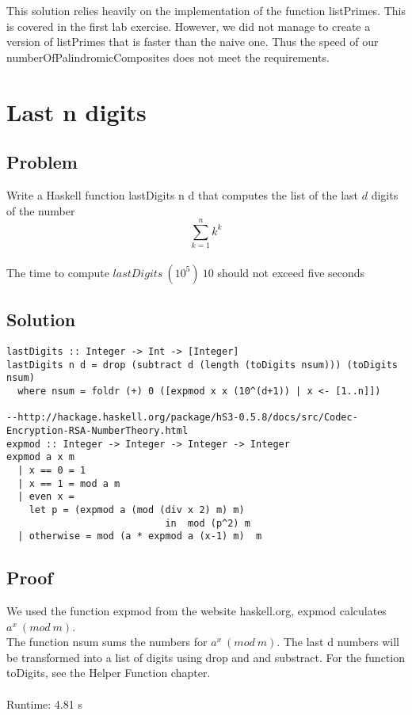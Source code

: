 \documentclass[a4paper,11pt]{article}
\begin{document}
This solution relies heavily on the implementation of the function listPrimes. This is covered in the first lab exercise. However, we did not manage to create a version of listPrimes that is faster than the naive one. Thus the speed of our numberOfPalindromicComposites does not meet the requirements.


\section{Last n digits}
\subsection{Problem}
Write a Haskell function lastDigits n d that computes the list of the last $d$ digits of the number
\begin{equation}
\sum\limits_{k=1}^n k^k
\end{equation}
\\
The time to compute $lastDigits\: (10^5)\: 10$ should not exceed five seconds

\subsection{Solution}

\begin{lstlisting}
lastDigits :: Integer -> Int -> [Integer]
lastDigits n d = drop (subtract d (length (toDigits nsum))) (toDigits nsum)
  where nsum = foldr (+) 0 ([expmod x x (10^(d+1)) | x <- [1..n]])

--http://hackage.haskell.org/package/hS3-0.5.8/docs/src/Codec-Encryption-RSA-NumberTheory.html
expmod :: Integer -> Integer -> Integer -> Integer
expmod a x m
  | x == 0 = 1
  | x == 1 = mod a m
  | even x =
    let p = (expmod a (mod (div x 2) m) m)
                            in  mod (p^2) m
  | otherwise = mod (a * expmod a (x-1) m)  m 
\end{lstlisting}

\subsection{Proof}
We used the function expmod from the website haskell.org, expmod calculates $a^x\: (mod\: m)$.\\ 
The function nsum sums the numbers for $a^x\: (mod\: m)$. The last d numbers will be transformed into a list of digits using drop and and substract. For the function toDigits, see the Helper Function chapter.\\
\\ 
Runtime: 4.81 s
\end{document}
